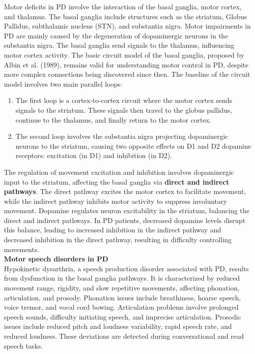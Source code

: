 Motor deficits in PD involve the interaction of the basal ganglia, motor cortex, and thalamus. The basal ganglia include structures such as the striatum, Globus Pallidus, subthalamic nucleus (STN), and substantia nigra. Motor impairments in PD are mainly caused by the degeneration of dopaminergic neurons in the substantia nigra. The basal ganglia send signals to the thalamus, influencing motor cortex activity. The basic circuit model of the basal ganglia, proposed by Albin et al. (1989), remains valid for understanding motor control in PD, despite more complex connections being discovered since then. The baseline of the circuit model involves two main parallel loops:
\begin{enumerate}
    \item The first loop is a cortex-to-cortex circuit where the motor cortex sends signals to the striatum. These signals then travel to the globus pallidus, continue to the thalamus, and finally return to the motor cortex.
    \item The second loop involves the substantia nigra projecting dopaminergic neurons to the striatum, causing two opposite effects on D1 and D2 dopamine receptors: excitation (in D1) and inhibition (in D2).
\end{enumerate}
The regulation of movement excitation and inhibition involves dopaminergic input to the striatum, affecting the basal ganglia via \textbf{direct and indirect pathways}. The direct pathway excites the motor cortex to facilitate movement, while the indirect pathway inhibits motor activity to suppress involuntary movement. Dopamine regulates neuron excitability in the striatum, balancing the direct and indirect pathways. In PD patients, decreased dopamine levels disrupt this balance, leading to increased inhibition in the indirect pathway and decreased inhibition in the direct pathway, resulting in difficulty controlling movements.\\
\textbf{Motor speech disorders in PD}\\
Hypokinetic dysarthria, a speech production disorder associated with PD, results from dysfunction in the basal ganglia pathways. It is characterized by reduced movement range, rigidity, and slow repetitive movements, affecting phonation, articulation, and prosody. Phonation issues include breathiness, hoarse speech, voice tremor, and vocal cord bowing. Articulation problems involve prolonged speech sounds, difficulty initiating speech, and imprecise articulation. Prosodic issues include reduced pitch and loudness variability, rapid speech rate, and reduced loudness. These deviations are detected during conversational and read speech tasks.
